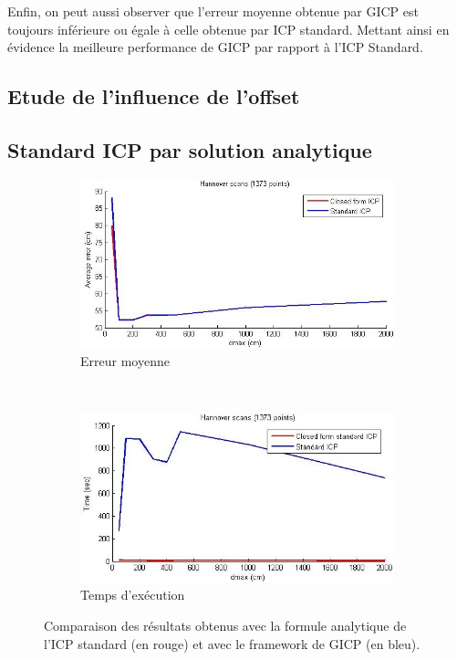 Enfin, on peut aussi observer que l'erreur moyenne obtenue par GICP est toujours inférieure ou égale à celle obtenue par ICP standard. Mettant ainsi en évidence la meilleure performance de GICP par rapport à l'ICP Standard.

\subsection{Etude de l'influence de l'offset}


\subsection{Standard ICP par solution analytique}

\begin{figure}[!h]
   \centering
   \begin{subfigure}[t]{.5\linewidth}
     \centering
     \includegraphics[scale=0.4]{Images/Resultats/hannover_diff_ICP_closed_form_dmax.jpg}
     \caption{Erreur moyenne}
   \end{subfigure}%
   ~
   \begin{subfigure}[t]{.5\linewidth}
     \centering
     \includegraphics[scale=0.4]{Images/Resultats/hannover_diff_time_ICP_closed_form_dmax.jpg}
     \caption{Temps d'exécution}
   \end{subfigure}
   
   \caption{Comparaison des résultats obtenus avec la formule analytique de l'ICP standard (en rouge) et avec le framework de GICP (en bleu).}
   \label{fig:meshlab}
\end{figure}